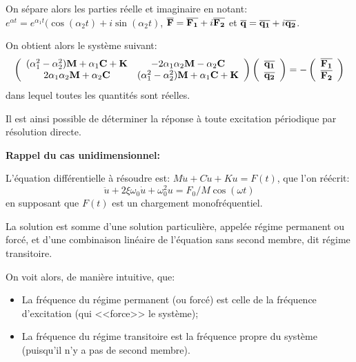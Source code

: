 \medskip
On sépare alors les parties réelle et imaginaire en notant:
$e^{\alpha t}=e^{\alpha_1 t}(\cos(\alpha_2 t)+i\sin(\alpha_2 t)$, $\mathbf{\overline{F}}=\mathbf{\overline{F_1}}
+i\mathbf{\overline{F_2}}$ et $\mathbf{\overline{q}}=\mathbf{\overline{q_1}}+i\mathbf{\overline{q_2}}$.

On obtient alors le système suivant:
\begin{equation}
\left( \begin{array}{cc}
(\alpha_1^2-\alpha_2^2)\mathbf{M}+\alpha_1\mathbf{C}+\mathbf{K} & -2\alpha_1\alpha_2\mathbf{M}-\alpha_2\mathbf{C}\\
2\alpha_1\alpha_2\mathbf{M}+\alpha_2\mathbf{C} & (\alpha_1^2-\alpha_2^2)\mathbf{M}+\alpha_1\mathbf{C}+\mathbf{K}
\end{array}\right)
\left( \begin{array}{c}
\mathbf{\overline{q_1}}\\ \mathbf{\overline{q_2}}
\end{array}\right)
=
-\left( \begin{array}{c}
\mathbf{\overline{F_1}}\\ \mathbf{\overline{F_2}}
\end{array}\right)
\end{equation}
dans lequel toutes les quantités sont réelles. 

Il est ainsi possible de déterminer la réponse à toute excitation périodique par résolution directe.

\medskip
{}

\medskip
{}
\textbf{Rappel du cas unidimensionnel:}

L'équation différentielle à résoudre est: $M\ddot{u}+C\dot{u}+Ku=F(t)$, que l'on
réécrit: \begin{equation} \ddot{u}+2\xi\omega_0\dot{u}+\omega^2_0 u=F_0/M \cos(\omega t)\end{equation}
en supposant que $F(t)$ est un chargement monofréquentiel. 

La solution est somme d'une solution particulière, appelée régime permanent ou forcé, et d'une
combinaison linéaire de l'équation sans second membre, dit régime transitoire.

On voit alors, de manière intuitive, que:
\begin{itemize}%
   \item La fréquence du régime permanent (ou forcé) est celle de la fréquence d'excitation (qui <<force>> le système);
   \item La fréquence du régime transitoire est la fréquence propre du système (puisqu'il n'y a pas de second membre).
\end{itemize}

